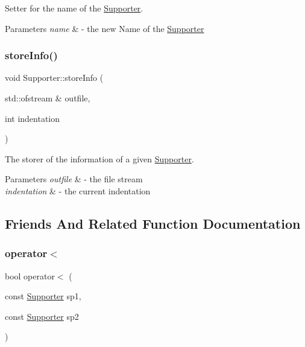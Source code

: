 Setter for the name of the \mbox{\hyperlink{class_supporter}{Supporter}}. 


\begin{DoxyParams}{Parameters}
{\em name} & -\/ the new Name of the \mbox{\hyperlink{class_supporter}{Supporter}} \\
\hline
\end{DoxyParams}
\mbox{\label{class_supporter_a83e75eda663c2dc14a60022e6e8f610f}} 
\subsubsection{\texorpdfstring{store\+Info()}{storeInfo()}}
{\footnotesize\ttfamily void Supporter\+::store\+Info (\begin{DoxyParamCaption}\item[{std\+::ofstream \&}]{outfile,  }\item[{int}]{indentation }\end{DoxyParamCaption})}



The storer of the information of a given \mbox{\hyperlink{class_supporter}{Supporter}}. 


\begin{DoxyParams}{Parameters}
{\em outfile} & -\/ the file stream \\
\hline
{\em indentation} & -\/ the current indentation \\
\hline
\end{DoxyParams}


\subsection{Friends And Related Function Documentation}
\mbox{\label{class_supporter_ad9883859b49ffaaf1e59f8aee0089e11}} 
\subsubsection{\texorpdfstring{operator$<$}{operator<}}
{\footnotesize\ttfamily bool operator$<$ (\begin{DoxyParamCaption}\item[{const \mbox{\hyperlink{class_supporter}{Supporter}}}]{sp1,  }\item[{const \mbox{\hyperlink{class_supporter}{Supporter}}}]{sp2 }\end{DoxyParamCaption})\hspace{0.3cm}{\ttfamily [friend]}}



